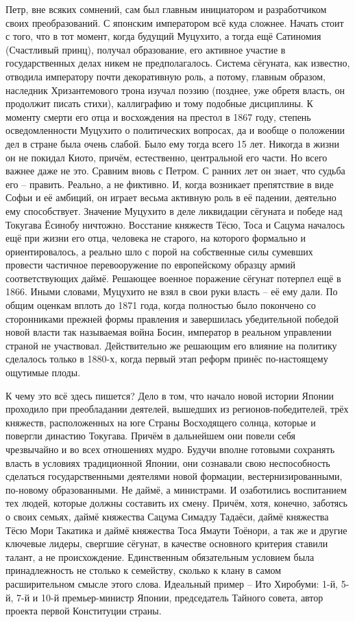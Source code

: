 Петр, вне всяких сомнений, сам был главным инициатором и разработчиком своих преобразований. С японским императором всё куда сложнее. Начать стоит с того, что в тот момент, когда будущий Муцухито, а тогда ещё Сатиномия (Счастливый принц), получал образование, его активное участие в государственных делах никем не предполагалось. Система сёгуната, как известно, отводила императору почти декоративную роль, а потому, главным образом, наследник Хризантемового трона изучал поэзию (позднее, уже обретя власть, он продолжит писать стихи), каллиграфию и тому подобные дисциплины. К моменту смерти его отца и восхождения на престол в 1867 году, степень осведомленности Муцухито о политических вопросах, да и вообще о положении дел в стране была очень слабой. Было ему тогда всего 15 лет. Никогда в жизни он не покидал Киото, причём, естественно, центральной его части. Но всего важнее даже не это. Сравним вновь с Петром. С ранних лет он знает, что судьба его – править. Реально, а не фиктивно. И, когда возникает препятствие в виде Софьи и её амбиций, он играет весьма активную роль в её падении, деятельно ему способствует. Значение Муцухито в деле ликвидации сёгуната и победе над Токугава Ёсинобу ничтожно. Восстание княжеств Тёсю, Тоса и Сацума началось ещё при жизни его отца, человека не старого, на которого формально и ориентировалось, а реально шло с порой на собственные силы сумевших провести частичное перевооружение по европейскому образцу армий соответствующих даймё. Решающее военное поражение сёгунат потерпел ещё в 1866. Иными словами, Муцухито не взял в свои руки власть – её ему дали. По общим оценкам вплоть до 1871 года, когда полностью было покончено со сторонниками прежней формы правления и завершилась убедительной победой новой власти так называемая война Босин, император в реальном управлении страной не участвовал. Действительно же решающим его влияние на политику сделалось только в 1880-х, когда первый этап реформ принёс по-настоящему ощутимые плоды.

К чему это всё здесь пишется? Дело в том, что начало новой истории Японии проходило при преобладании деятелей, вышедших из регионов-победителей, трёх княжеств, расположенных на юге Страны Восходящего солнца, которые и повергли династию Токугава. Причём в дальнейшем они повели себя чрезвычайно и во всех отношениях мудро. Будучи вполне готовыми сохранять власть в условиях традиционной Японии, они сознавали свою неспособность сделаться государственными деятелями новой формации, вестернизированными, по-новому образованными. Не даймё, а министрами. И озаботились воспитанием тех людей, которые должны составить их смену. Причём, хотя, конечно, заботясь о своих семьях, даймё княжества Сацума Симадзу Тадаёси, даймё княжества Тёсю Мори Такатика и даймё княжества Тоса Ямаути Тоёнори, а так же и другие ключевые лидеры, свергшие сёгунат, в качестве основного критерия ставили талант, а не происхождение. Единственным обязательным условием была принадлежность не столько к семейству, сколько к клану в самом расширительном смысле этого слова. Идеальный пример – Ито Хиробуми: 1-й, 5-й, 7-й и 10-й премьер-министр Японии, председатель Тайного совета, автор проекта первой Конституции страны. 

